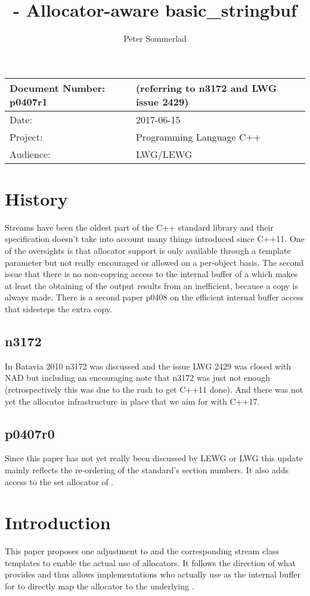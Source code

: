 \documentclass[ebook,11pt,article]{memoir}
\title{\papernumber{} - Allocator-aware basic\_stringbuf}
\author{Peter Sommerlad}
\date{\paperdate}                        %
\newcommand{\papernumber}{p0407r1}
\newcommand{\paperdate}{2017-06-15}
\begin{document}
\maketitle
\begin{tabular}[t]{|l|l|}\hline 
Document Number: \papernumber &   (referring to n3172 and LWG issue 2429)\\\hline
Date: & \paperdate \\\hline
Project: & Programming Language C++\\\hline 
Audience: & LWG/LEWG\\\hline
\end{tabular}

\chapter{History}
Streams have been the oldest part of the C++ standard library and their specification doesn't take into account many things introduced since C++11. One of  the oversights is that allocator support is only available through a template parameter but not really encouraged or allowed on a per-object basis. The second issue that there is no non-copying access to the internal buffer of a  which makes at least the obtaining of the output results from an  inefficient, because a copy is always made. There is a second paper p0408 on the efficient internal buffer access that sidesteps the extra copy.
\section{n3172}
In Batavia 2010 n3172 was discussed and the issue LWG 2429 was closed with NAD but including an encouraging note that n3172 was just not enough (retrospectively this was due to the rush to get C++11 done). And there was not yet the allocator infrastructure in place that we aim for with C++17.
\section{p0407r0}
Since this paper has not yet really been discussed by LEWG or LWG this update mainly reflects the re-ordering of the standard's section numbers. It also adds access to the set allocator of .

\chapter{Introduction}
This paper proposes one adjustment to  and the corresponding stream class templates to enable the actual use of allocators. It follows the direction of what  provides and thus allows implementations who actually use  as the internal buffer for  to directly map the allocator to the underlying .
\end{document}
